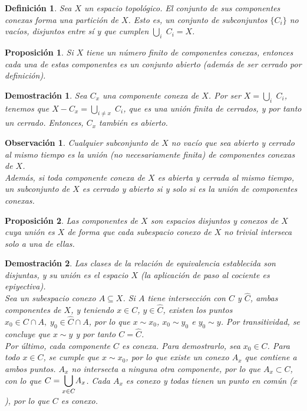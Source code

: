 \documentclass[12pt,twoside]{report}
\theoremstyle{azul}
\newtheorem*{propx}{Proposición}
\newtheorem*{demx}{Demostración}
\newtheorem*{defix}{Definición}
\theoremstyle{azul2}
\newtheorem*{obsx}{Observación}
\theoremstyle{plain}
\theoremstyle{definition}
\theoremstyle{remark}
\begin{document}
\begin{defix}
Sea $X$ un espacio topológico. El conjunto de sus componentes conexas forma una partición de $X$. Esto es, un conjunto de subconjuntos $\{C_i\}$ no vacíos, disjuntos entre sí y que cumplen $\underset{i}{\bigcup} \; C_i = X$.
\end{defix}

\begin{propx}
Si $X$ tiene un número finito de componentes conexas, entonces cada una de estas componentes es un conjunto abierto (además de ser cerrado por definición).
\end{propx}
\begin{demx}
Sea $C_x$ una componente conexa de $X$. Por ser $X = \underset{i}{\bigcup} \; C_i$, tenemos que $X - C_x = \underset{i \neq x}{\bigcup} \; C_i$, que es una unión finita de cerrados, y por tanto un cerrado. Entonces, $C_x$ también es abierto.
\end{demx}

\begin{obsx}
Cualquier subconjunto de $X$ no vacío que sea abierto y cerrado al mismo tiempo es la unión (no necesariamente finita) de componentes conexas de $X$.\\
Además, si toda componente conexa de $X$ es abierta y cerrada al mismo tiempo, un subconjunto de $X$ es cerrado y abierto si y solo si es la unión de componentes conexas.
\end{obsx}
\vspace{5mm}

\begin{propx}
Las componentes de $X$ son espacios disjuntos y conexos de $X$ cuya unión es $X$ de forma que cada subespacio conexo de $X$ no trivial interseca solo a una de ellas.
\end{propx}
\begin{demx}
Las clases de la relación de equivalencia establecida son disjuntas, y su unión es el espacio $X$ (la aplicación de paso al cociente es epiyectiva).\\
Sea un subespacio conexo $A \subseteq X$. Si $A$ tiene intersección con $C$ y $\hat{C}$, ambas componentes de $X$, y teniendo $x \in C$, $y \in \hat{C}$, existen los puntos $x_0 \in C \cap A,\;y_0 \in \hat{C} \cap A$, por lo que $x \sim x_0$, $x_0 \sim y_0$ e $y_0 \sim y$. Por transitividad, se concluye que $x \sim y$ y por tanto $C = \hat{C}$.\\
Por último, cada componente $C$ es conexa. Para demostrarlo, sea $x_0 \in C$. Para todo $x \in C$, se cumple que $x \sim x_0$, por lo que existe un conexo $A_x$ que contiene a ambos puntos. $A_x$ no intersecta a ninguna otra componente, por lo que $A_x \subset C$, con lo que $C =  \mathlarger{\underset{x \in C}{\bigcup}} A_x$. Cada $A_x$ es conexo y todas tienen un punto en común ($x$), por lo que $C$ es conexo.
\end{demx}
\end{document}
